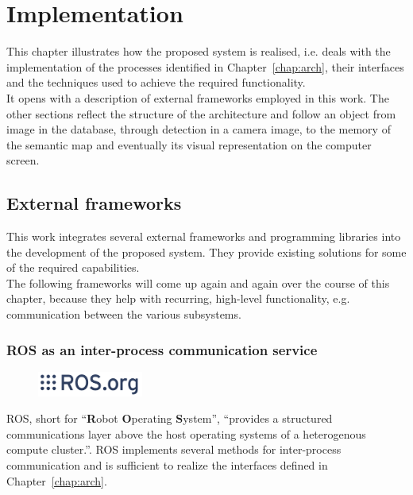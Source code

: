 \chapter{Implementation}
\label{chap:impl}
This chapter illustrates how the proposed system is realised, i.e. deals with the implementation of the processes identified in Chapter~\ref{chap:arch}, their interfaces and the techniques used to achieve the required functionality. \\

It opens with a description of external frameworks employed in this work. The other sections reflect the structure of the architecture and follow an object from image in the database, through detection in a camera image, to the memory of the semantic map and eventually its visual representation on the computer screen.


\section{External frameworks}
\label{sec:impl-external}
This work integrates several external frameworks and programming libraries into the development of the proposed system. They provide existing solutions for some of the required capabilities. \\

The following frameworks will come up again and again over the course of this chapter, because they help with recurring, high-level functionality, e.g. communication between the various subsystems.

\subsection{ROS as an inter-process communication service}
\label{sec:impl-ros}
\begin{figure}
  \vspace{-10pt}
  \centering
  \includegraphics[width=0.31\textwidth]{images/Logo_ROS.png}
  \vspace{-10pt}
\end{figure}

ROS, short for ``\textbf{R}obot \textbf{O}perating \textbf{S}ystem'', ``provides a structured communications layer above the host operating systems of a heterogenous compute cluster.''\cite{quigley2009ros}. ROS implements several methods for inter-process communication and is sufficient to realize the interfaces defined in Chapter~\ref{chap:arch}. \\

